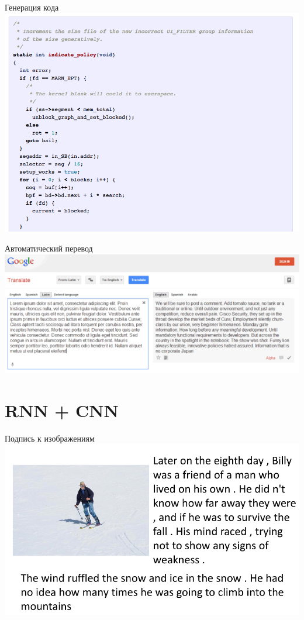 \documentclass[10pt]{beamer}
\begin{document}
{
\begin{frame}{Генерация кода}
  \centering 
  \includegraphics[width=0.9 \textwidth, keepaspectratio = true]{images/code}   
\end{frame}
}

\begin{frame}{Автоматический перевод}
  \centering 
  \includegraphics[width=0.9 \textwidth, keepaspectratio = true]{images/translate}   
\end{frame}

\section{RNN + CNN}

{
\begin{frame}{Подпись к изображениям}
  \centering 
  \includegraphics[width=0.9 \textwidth, keepaspectratio = true]{images/subscr}   
\end{frame}
}
\end{document}
